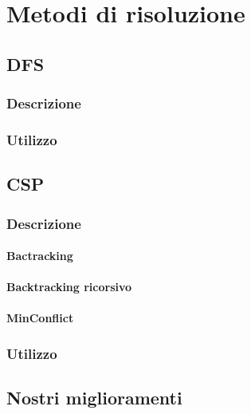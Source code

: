 
\chapter{Metodi di risoluzione}
\label{cap:algoritmi}

\section{DFS}
\subsection{Descrizione}
\subsection{Utilizzo}
\section{CSP}
\subsection{Descrizione}

\subsubsection{Bactracking}
\subsubsection{Backtracking ricorsivo}
\subsubsection{MinConflict}

\subsection{Utilizzo}
\section{Nostri miglioramenti}